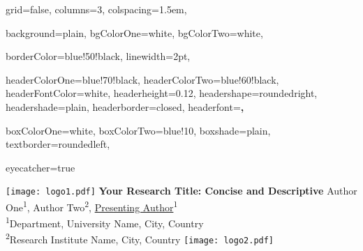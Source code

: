 \documentclass[a0paper,portrait,fontscale=0.285]{baposter}
\begin{document}
\begin{poster}{
  
  grid=false,                    %
  columns=3,                     %
  colspacing=1.5em,              %
  
  background=plain,              %
  bgColorOne=white,
  bgColorTwo=white,
  
  borderColor=blue!50!black,
  linewidth=2pt,
  
  headerColorOne=blue!70!black,
  headerColorTwo=blue!60!black,
  headerFontColor=white,
  headerheight=0.12\textheight,
  headershape=roundedright,      %
  headershade=plain,             %
  headerborder=closed,           %
  headerfont=\Large\sf\bf,
  
  boxColorOne=white,
  boxColorTwo=blue!10,
  boxshade=plain,
  textborder=roundedleft,        %
  
  eyecatcher=true
}
{
  \texttt{[image: logo1.pdf]}
}
{
  \sf\bf Your Research Title: Concise and Descriptive
}
{
  \vspace{0.3em}
  Author One\textsuperscript{1}, Author Two\textsuperscript{2}, \underline{Presenting Author}\textsuperscript{1}\\[0.3em]
  {\small
  \textsuperscript{1}Department, University Name, City, Country\\
  \textsuperscript{2}Research Institute Name, City, Country}
}
{
  \texttt{[image: logo2.pdf]}
}


\end{poster}
\end{document}
